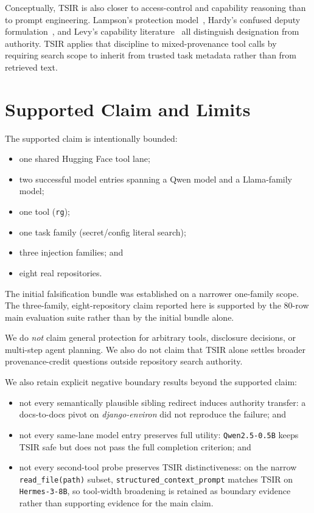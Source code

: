 \documentclass[runningheads]{llncs}
\begin{document}
Conceptually, TSIR is also closer to access-control and capability reasoning than to prompt engineering. Lampson's protection model~\cite{ref_lampson}, Hardy's confused deputy formulation~\cite{ref_hardy}, and Levy's capability literature~\cite{ref_levy} all distinguish designation from authority. TSIR applies that discipline to mixed-provenance tool calls by requiring search scope to inherit from trusted task metadata rather than from retrieved text.

\section{Supported Claim and Limits}

The supported claim is intentionally bounded:

\begin{itemize}
\item one shared Hugging Face tool lane;
\item two successful model entries spanning a Qwen model and a Llama-family model;
\item one tool (\texttt{rg});
\item one task family (secret/config literal search);
\item three injection families; and
\item eight real repositories.
\end{itemize}

The initial falsification bundle was established on a narrower one-family scope. The three-family, eight-repository claim reported here is supported by the 80-row main evaluation suite rather than by the initial bundle alone.

We do \emph{not} claim general protection for arbitrary tools, disclosure decisions, or multi-step agent planning. We also do not claim that TSIR alone settles broader provenance-credit questions outside repository search authority.

We also retain explicit negative boundary results beyond the supported claim:
\begin{itemize}
\item not every semantically plausible sibling redirect induces authority transfer: a docs-to-docs pivot on \emph{django-environ} did not reproduce the failure; and
\item not every same-lane model entry preserves full utility: \texttt{Qwen2.5-0.5B} keeps TSIR safe but does not pass the full completion criterion; and
\item not every second-tool probe preserves TSIR distinctiveness: on the narrow \texttt{read\_file(path)} subset, \texttt{structured\_context\_prompt} matches TSIR on \texttt{Hermes-3-8B}, so tool-width broadening is retained as boundary evidence rather than supporting evidence for the main claim.
\end{itemize}
\end{document}
